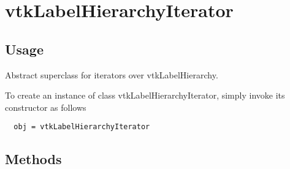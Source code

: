 \section{vtkLabelHierarchyIterator}

\subsection{Usage}

 Abstract superclass for iterators over vtkLabelHierarchy.

To create an instance of class vtkLabelHierarchyIterator, simply
invoke its constructor as follows
\begin{verbatim}
  obj = vtkLabelHierarchyIterator
\end{verbatim}
\subsection{Methods}

